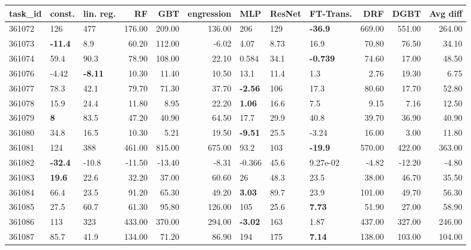 \begin{table}[ht!]
\centering
\begingroup\footnotesize
\begin{tabular}{lllrrrlllrrr}
  \hline
\hline
task\_id & const. & lin. reg. & RF & GBT & engression & MLP & ResNet & FT-Trans. & DRF & DGBT & Avg diff \\ 
  \hline
361072 & 126 & 477 & 176.00 & 209.00 & 136.00 & 206 & 129 & \textbf{-36.9} & 669.00 & 551.00 & 264.00 \\ 
  361073 & \textbf{-11.4} & 8.9 & 60.20 & 112.00 & -6.02 & 4.07 & 8.73 & 16.9 & 70.80 & 76.50 & 34.10 \\ 
  361074 & 59.4 & 90.3 & 78.90 & 108.00 & 22.10 & 0.584 & 34.1 & \textbf{-0.739} & 74.60 & 17.00 & 48.50 \\ 
  361076 & -4.42 & \textbf{-8.11} & 10.30 & 11.40 & 10.50 & 13.1 & 11.4 & 1.3 & 2.76 & 19.30 & 6.75 \\ 
  361077 & 78.3 & 42.1 & 79.70 & 71.30 & 37.70 & \textbf{-2.56} & 106 & 17.3 & 80.60 & 17.70 & 52.80 \\ 
  361078 & 15.9 & 24.4 & 11.80 & 8.95 & 22.20 & \textbf{1.06} & 16.6 & 7.5 & 9.15 & 7.16 & 12.50 \\ 
  361079 & \textbf{8} & 83.5 & 47.20 & 40.90 & 64.50 & 17.7 & 29.9 & 40.8 & 39.70 & 36.90 & 40.90 \\ 
  361080 & 34.8 & 16.5 & 10.30 & 5.21 & 19.50 & \textbf{-9.51} & 25.5 & -3.24 & 16.00 & 3.00 & 11.80 \\ 
  361081 & 124 & 388 & 461.00 & 815.00 & 675.00 & 93.2 & 103 & \textbf{-19.9} & 570.00 & 422.00 & 363.00 \\ 
  361082 & \textbf{-32.4} & -10.8 & -11.50 & -13.40 & -8.31 & -0.366 & 45.6 & 9.27e-02 & -4.82 & -12.20 & -4.80 \\ 
  361083 & \textbf{19.6} & 22.6 & 32.20 & 37.00 & 60.60 & 26 & 48.3 & 23.5 & 38.00 & 46.70 & 35.50 \\ 
  361084 & 66.4 & 23.5 & 91.20 & 65.30 & 49.20 & \textbf{3.03} & 89.7 & 23.9 & 101.00 & 49.70 & 56.30 \\ 
  361085 & 27.5 & 60.7 & 61.30 & 95.80 & 126.00 & 105 & 25.6 & \textbf{7.73} & 51.90 & 27.00 & 58.90 \\ 
  361086 & 113 & 323 & 433.00 & 370.00 & 294.00 & \textbf{-3.02} & 163 & 1.87 & 437.00 & 327.00 & 246.00 \\ 
  361087 & 85.7 & 41.9 & 134.00 & 71.20 & 86.90 & 194 & 175 & \textbf{7.14} & 138.00 & 103.00 & 104.00 \\ 

\end{tabular}
\end{table}
